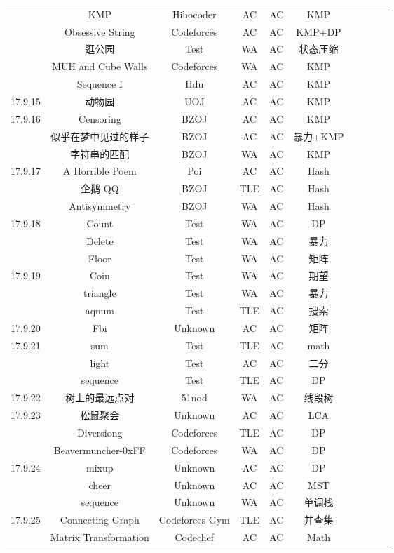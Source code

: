 \documentclass[landscape]{article}
\begin{document}
\begin{longtable}{cccccccccc}
  & KMP & Hihocoder& AC& AC& KMP\\
  & Obsessive String& Codeforces& AC& AC& KMP+DP\\
  & 逛公园 &Test &WA &AC& 状态压缩\\
  & MUH and Cube Walls& Codeforces& WA &AC& KMP\\
  & Sequence I &Hdu &AC &AC& KMP\\
  \hline
  17.9.15 & 动物园 &UOJ& AC& AC &KMP\\
  \hline
  17.9.16 &Censoring& BZOJ& AC& AC& KMP\\
  &似乎在梦中见过的样子 &BZOJ &AC &AC& 暴力+KMP\\
  &字符串的匹配 &BZOJ &WA& AC &KMP\\
  \hline
  17.9.17 &A Horrible Poem &Poi& AC& AC& Hash\\
  &企鹅 QQ &BZOJ& TLE &AC& Hash\\
  &Antisymmetry& BZOJ &WA& AC& Hash\\
  \hline
  17.9.18 &Count &Test& WA& AC& DP\\
  &Delete &Test& WA& AC &暴力\\
  &Floor& Test& WA& AC& 矩阵\\
  \hline
  17.9.19 &Coin &Test& WA &AC& 期望\\
  &triangle &Test& WA &AC& 暴力\\
  &aqnum &Test& TLE &AC& 搜索\\
  \hline
  17.9.20 & Fbi &Unknown& AC &AC &矩阵\\
  \hline
  17.9.21 & sum& Test& TLE& AC& math\\
  &light& Test& AC& AC& 二分\\
  &sequence& Test &TLE& AC &DP\\
  \hline
  17.9.22 &树上的最远点对& 51nod& WA& AC& 线段树\\
  \hline
  17.9.23 &松鼠聚会 &Unknown &AC& AC &LCA\\
  &Diversiong& Codeforces& TLE &AC &DP\\
  &Beavermuncher-0xFF& Codeforces& WA& AC& DP\\
  \hline
  17.9.24 & mixup& Unknown& AC& AC& DP\\
  & cheer &Unknown &AC& AC &MST\\
  &sequence &Unknown &WA &AC &单调栈\\
  \hline
  17.9.25 &Connecting Graph& Codeforces Gym &TLE &AC& 并查集\\
  &Matrix Transformation& Codechef& AC &AC &Math\\
  \hline

\end{longtable}
\end{document}
